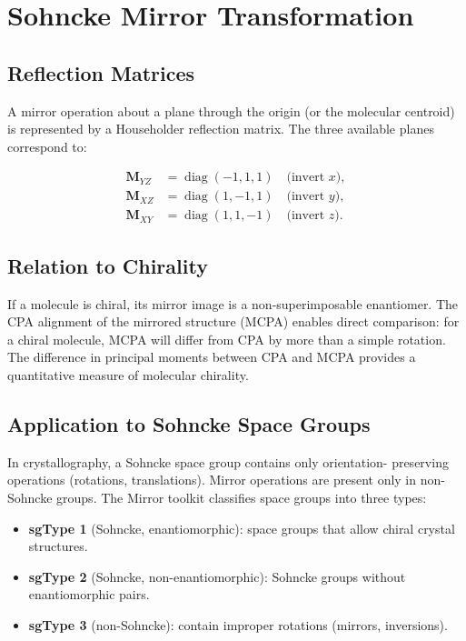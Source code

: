 \documentclass[11pt,a4paper]{article}
\newcommand{\vect}[1]{\bm{#1}}
\begin{document}
\section{Sohncke Mirror Transformation}

\subsection{Reflection Matrices}

A mirror operation about a plane through the origin (or the molecular
centroid) is represented by a Householder reflection matrix.  The three
available planes correspond to:

\begin{align}
\vect{M}_{YZ} &= \operatorname{diag}(-1, 1, 1) \quad \text{(invert $x$)}, \\
\vect{M}_{XZ} &= \operatorname{diag}(1, -1, 1) \quad \text{(invert $y$)}, \\
\vect{M}_{XY} &= \operatorname{diag}(1, 1, -1) \quad \text{(invert $z$)}.
\end{align}

\subsection{Relation to Chirality}

If a molecule is chiral, its mirror image is a non-superimposable
enantiomer.  The CPA alignment of the mirrored structure (MCPA) enables
direct comparison: for a chiral molecule, MCPA will differ from CPA by
more than a simple rotation.  The difference in principal moments between
CPA and MCPA provides a quantitative measure of molecular chirality.

\subsection{Application to Sohncke Space Groups}

In crystallography, a Sohncke space group contains only orientation-
preserving operations (rotations, translations).  Mirror operations are
present only in non-Sohncke groups.  The Mirror toolkit classifies space
groups into three types:

\begin{itemize}
    \item \textbf{sgType 1} (Sohncke, enantiomorphic): space groups
          that allow chiral crystal structures.
    \item \textbf{sgType 2} (Sohncke, non-enantiomorphic): Sohncke
          groups without enantiomorphic pairs.
    \item \textbf{sgType 3} (non-Sohncke): contain improper rotations
          (mirrors, inversions).
\end{itemize}
\end{document}
